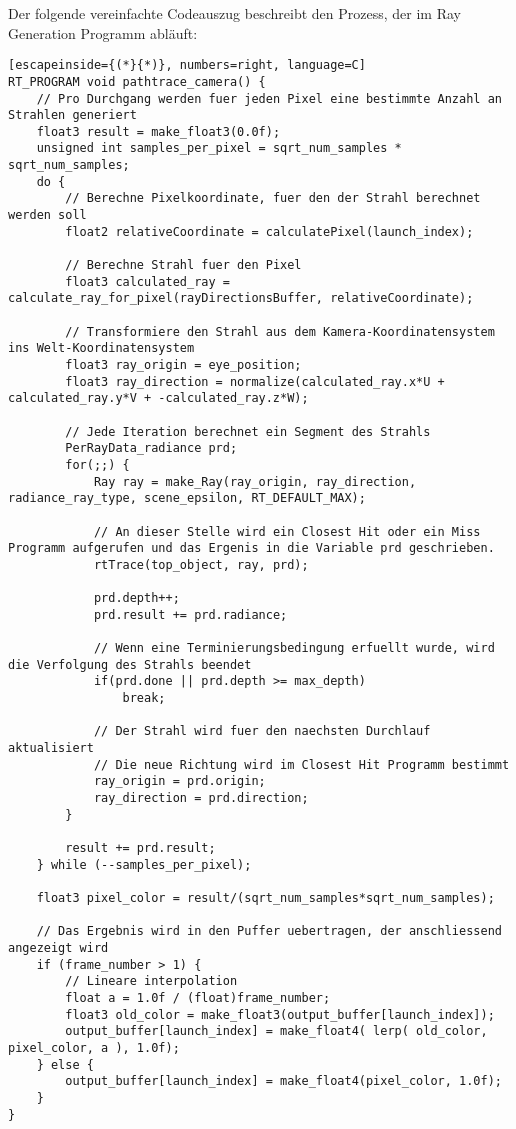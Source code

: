 \documentclass[thesis.tex]{subfiles}
\begin{document}
Der folgende vereinfachte Codeauszug beschreibt den Prozess, der im Ray Generation Programm abläuft: 
%
\begin{lstlisting}[escapeinside={(*}{*)}, numbers=right, language=C]
RT_PROGRAM void pathtrace_camera() {
    // Pro Durchgang werden fuer jeden Pixel eine bestimmte Anzahl an Strahlen generiert
    float3 result = make_float3(0.0f);
    unsigned int samples_per_pixel = sqrt_num_samples * sqrt_num_samples;
    do {
        // Berechne Pixelkoordinate, fuer den der Strahl berechnet werden soll
        float2 relativeCoordinate = calculatePixel(launch_index);
        
        // Berechne Strahl fuer den Pixel
        float3 calculated_ray = calculate_ray_for_pixel(rayDirectionsBuffer, relativeCoordinate);

        // Transformiere den Strahl aus dem Kamera-Koordinatensystem ins Welt-Koordinatensystem
        float3 ray_origin = eye_position;
        float3 ray_direction = normalize(calculated_ray.x*U + calculated_ray.y*V + -calculated_ray.z*W);

        // Jede Iteration berechnet ein Segment des Strahls
        PerRayData_radiance prd;
        for(;;) {
            Ray ray = make_Ray(ray_origin, ray_direction, radiance_ray_type, scene_epsilon, RT_DEFAULT_MAX);
            
            // An dieser Stelle wird ein Closest Hit oder ein Miss Programm aufgerufen und das Ergenis in die Variable prd geschrieben.
            rtTrace(top_object, ray, prd);

            prd.depth++;
            prd.result += prd.radiance;
            
            // Wenn eine Terminierungsbedingung erfuellt wurde, wird die Verfolgung des Strahls beendet
            if(prd.done || prd.depth >= max_depth)
                break;
            
            // Der Strahl wird fuer den naechsten Durchlauf aktualisiert
            // Die neue Richtung wird im Closest Hit Programm bestimmt
            ray_origin = prd.origin;
            ray_direction = prd.direction;
        }

        result += prd.result;
    } while (--samples_per_pixel);

    float3 pixel_color = result/(sqrt_num_samples*sqrt_num_samples);

    // Das Ergebnis wird in den Puffer uebertragen, der anschliessend angezeigt wird
    if (frame_number > 1) {
        // Lineare interpolation
        float a = 1.0f / (float)frame_number;
        float3 old_color = make_float3(output_buffer[launch_index]);
        output_buffer[launch_index] = make_float4( lerp( old_color, pixel_color, a ), 1.0f);
    } else {
        output_buffer[launch_index] = make_float4(pixel_color, 1.0f);
    }
}
\end{lstlisting}
\end{document}

